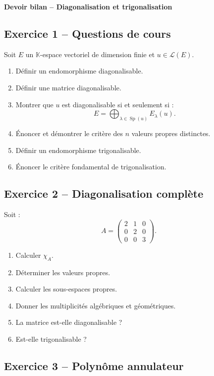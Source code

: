 \documentclass[11pt,a4paper]{article}
\newcommand{\K}{\mathbb K}
\newcommand{\Lcal}{\mathcal L}
\newcommand{\Sp}{\operatorname{Sp}}
\begin{document}
\begin{center}
\Large\textbf{Devoir bilan -- Diagonalisation et trigonalisation}
\end{center}

\subsection*{Exercice 1 -- Questions de cours}

Soit \(E\) un \(\K\)-espace vectoriel de dimension finie et \(u\in\Lcal(E)\).

\begin{enumerate}
    \item Définir un endomorphisme diagonalisable.
    \item Définir une matrice diagonalisable.
    \item Montrer que \(u\) est diagonalisable si et seulement si :
    \[
    E=\bigoplus_{\lambda\in\Sp(u)}E_\lambda(u).
    \]
    \item Énoncer et démontrer le critère des \(n\) valeurs propres distinctes.
    \item Définir un endomorphisme trigonalisable.
    \item Énoncer le critère fondamental de trigonalisation.
\end{enumerate}

\subsection*{Exercice 2 -- Diagonalisation complète}

Soit :
\[
A=
\begin{pmatrix}
2&1&0\\
0&2&0\\
0&0&3
\end{pmatrix}.
\]

\begin{enumerate}
    \item Calculer \(\chi_A\).
    \item Déterminer les valeurs propres.
    \item Calculer les sous-espaces propres.
    \item Donner les multiplicités algébriques et géométriques.
    \item La matrice est-elle diagonalisable ?
    \item Est-elle trigonalisable ?
\end{enumerate}

\subsection*{Exercice 3 -- Polynôme annulateur}
\end{document}
